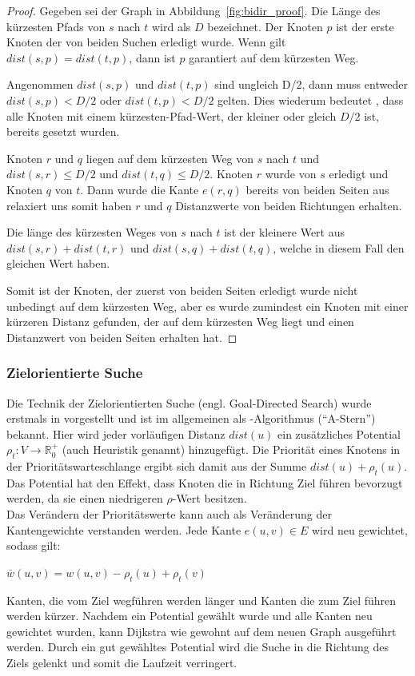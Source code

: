\begin{proof}
    Gegeben sei der Graph in Abbildung~\ref{fig:bidir_proof}. Die Länge des kürzesten Pfads von $s$
    nach $t$ wird als $D$ bezeichnet. Der Knoten $p$ ist der erste Knoten der von beiden Suchen
    erledigt wurde. Wenn gilt $dist(s,p) = dist(t,p)$, dann ist $p$ garantiert auf dem kürzesten Weg.

    Angenommen $dist(s,p)$ und $dist(t,p)$ sind ungleich D/2, dann muss entweder ${dist(s,p) < D/2}$
    oder $dist(t,p) < D/2$ gelten. Dies wiederum bedeutet , dass alle Knoten mit einem
    kürzesten-Pfad-Wert, der kleiner oder gleich $D/2$ ist, bereits gesetzt wurden.

    Knoten $r$ und $q$ liegen auf dem kürzesten Weg von $s$ nach $t$ und ${dist(s,r) \le D/2}$ und
    ${dist(t,q) \le D/2}$. Knoten $r$ wurde von $s$ erledigt und Knoten $q$ von $t$. Dann wurde die
    Kante $e(r,q)$ bereits von beiden Seiten aus relaxiert uns somit haben $r$ und $q$ Distanzwerte
    von beiden Richtungen erhalten.

    Die länge des kürzesten Weges von $s$ nach $t$ ist der kleinere Wert aus ${dist(s,r) + dist(t,r)}$
    und ${dist(s,q) + dist(t,q)}$, welche in diesem Fall den gleichen Wert haben.

    Somit ist der Knoten, der zuerst von beiden Seiten erledigt wurde nicht unbedingt auf dem
    kürzesten Weg, aber es wurde zumindest ein Knoten mit einer kürzeren Distanz gefunden, der auf
    dem kürzesten Weg liegt und einen Distanzwert von beiden Seiten erhalten hat.
\end{proof}

\subsubsection{Zielorientierte Suche}
Die Technik der Zielorientierten Suche (engl. Goal-Directed Search) wurde erstmals in
\cite{Hart.1968} vorgestellt und ist im allgemeinen als \astar-Algorithmus ("`A-Stern"') bekannt.
Hier wird jeder vorläufigen Distanz $dist(u)$ ein zusätzliches Potential $\rho_t: V \rightarrow
    \mathbb{R}_0^+$ (auch Heuristik genannt) hinzugefügt. Die Priorität eines Knotens in der
Prioritätswarteschlange ergibt sich damit aus der Summe ${dist(u) + \rho_t(u)}$. Das Potential hat
den Effekt, dass Knoten die in Richtung Ziel führen bevorzugt werden, da sie einen niedrigeren
$\rho$-Wert besitzen.\\
Das Verändern der Prioritätswerte kann auch als Veränderung der Kantengewichte verstanden werden.
Jede Kante $e(u,v) \in E$ wird neu gewichtet, sodass gilt:
\begin{definition}
    $\bar{w}(u,v)=w(u,v)-\rho_t (u)+\rho_t (v)$
    \label{def:edge_weight}
\end{definition}
Kanten, die vom Ziel wegführen werden länger und Kanten die zum Ziel führen werden kürzer. Nachdem
ein Potential gewählt wurde und alle Kanten neu gewichtet wurden, kann Dijkstra wie gewohnt auf dem
neuen Graph ausgeführt werden. Durch ein gut gewähltes Potential wird die Suche in die Richtung des
Ziels gelenkt und somit die Laufzeit verringert.\\

